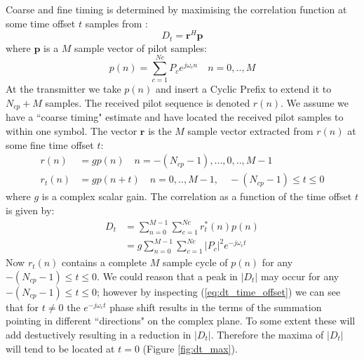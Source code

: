 \documentclass{article}
\begin{document}
Coarse and fine timing is determined by maximising the correlation function at some time offset $t$ samples from \cite{freedv_low}:
\begin{equation}
\label{eq:dt}
D_t = \bm{r}^H\bm{p}
\end{equation}
where $\bm{p}$ is a $M$ sample vector of pilot samples:
\begin{equation}
p(n)=\sum_{c=1}^{Nc}P_c e^{j \omega_c n} \quad n=0,..,M
\end{equation}
At the transmitter we take $p(n)$ and insert a Cyclic Prefix to extend it to $N_{cp}+M$ samples. The received pilot sequence is denoted $r(n)$. We assume we have a ``coarse timing" estimate and have located the received pilot samples to within one symbol. The vector $\bm{r}$ is the $M$ sample vector extracted from $r(n)$ at some fine time offset $t$:
\begin{equation}
\begin{split}
r(n)   &= g p(n) \quad n=-(N_{cp}-1),...,0,..,M-1 \\
r_t(n) &= g p(n+t) \quad n=0,..,M-1, \quad -(N_{cp}-1) \le t \le 0
\end{split}
\end{equation}
where $g$ is a complex scalar gain. The correlation as a function of the time offset $t$ is given by:
\begin{equation}
\label{eq:dt_time_offset}
\begin{split}
D_t &= \sum_{n=0}^{M-1} \sum_{c=1}^{Nc}r_t^*(n)p(n) \\
    &= g \sum_{n=0}^{M-1} \sum_{c=1}^{Nc} |P_c|^2 e^{-j \omega_c t}
\end{split}
\end{equation}
Now $r_t(n)$ contains a complete $M$ sample cycle of $p(n)$ for any $-(N_{cp}-1) \le t \le 0$.  We could reason that a peak in $|D_t|$ may occur for any $-(N_{cp}-1) \le t \le 0$; however by inspecting (\ref{eq:dt_time_offset}) we can see that for $t \ne 0$ the $e^{-j \omega_c t}$ phase shift results in the terms of the summation pointing in different ``directions" on the complex plane.  To some extent these will add destuctively resulting in a reduction in $|D_t|$.  Therefore the maxima of $|D_t|$ will tend to be located at $t=0$ (Figure \ref{fig:dt_max}).
\end{document}
